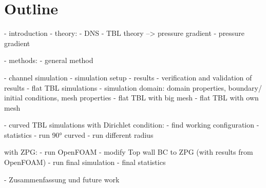 \chapter{Outline}
\label{sec:outline}

- introduction
- theory: 
    - DNS 
    - TBL theory --> pressure gradient
    - pressure gradient


- methods: 
    - general method

- channel simulation
    - simulation setup
    - results
    - verification and validation of results
- flat TBL simulations
    - simulation domain: domain properties, boundary/ initial conditions, mesh properties
    - flat TBL with big mesh
    - flat TBL with own mesh

- curved TBL simulations 
    with Dirichlet condition:
    - find working configuration
    - statistics
    - run 90° curved
    - run different radius

    with ZPG:
    - run OpenFOAM
    - modify Top wall BC to ZPG (with results from OpenFOAM)
    - run final simulation
    - final statistics

    
- Zusammenfassung und future work




